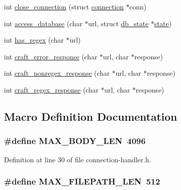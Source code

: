 \begin{DoxyCompactItemize}
int \hyperlink{connection-handler_8h_a0171242e91a6a1c18938b8aba84625e5}{close\-\_\-connection} (struct \hyperlink{structconnection}{connection} $\ast$conn)
\item 
int \hyperlink{connection-handler_8h_a371095605bf8a8222590bc46b2d38b59}{access\-\_\-database} (char $\ast$url, struct \hyperlink{structdb__state}{db\-\_\-state} $\ast$\hyperlink{http__parser_8c_adc6e5733fc3c22f0a7b2914188c49c90}{state})
\item 
int \hyperlink{connection-handler_8h_aad4e23d034482bdd8a28174ff70d3ea0}{has\-\_\-regex} (char $\ast$url)
\item 
int \hyperlink{connection-handler_8h_a8df53347c2a2137c4f39c79fbe3af03e}{craft\-\_\-error\-\_\-response} (char $\ast$url, char $\ast$response)
\item 
int \hyperlink{connection-handler_8h_a40ddee505082e691c9e94a8afda7d4b5}{craft\-\_\-nonregex\-\_\-response} (char $\ast$url, char $\ast$response)
\item 
int \hyperlink{connection-handler_8h_a7cb78a1a29fdde2658e016d01287bf7a}{craft\-\_\-regex\-\_\-response} (char $\ast$url, char $\ast$response)
\end{DoxyCompactItemize}


\subsection{Macro Definition Documentation}
\hypertarget{connection-handler_8h_ab5d508eee849407d84f67ece294ac8b0}{
\subsubsection[{M\-A\-X\-\_\-\-B\-O\-D\-Y\-\_\-\-L\-E\-N}]{\setlength{\rightskip}{0pt plus 5cm}\#define M\-A\-X\-\_\-\-B\-O\-D\-Y\-\_\-\-L\-E\-N~4096}}\label{connection-handler_8h_ab5d508eee849407d84f67ece294ac8b0}


Definition at line 30 of file connection-\/handler.\-h.

\hypertarget{connection-handler_8h_a55d3700b57daefe139c225b101a6d89f}{
\subsubsection[{M\-A\-X\-\_\-\-F\-I\-L\-E\-P\-A\-T\-H\-\_\-\-L\-E\-N}]{\setlength{\rightskip}{0pt plus 5cm}\#define M\-A\-X\-\_\-\-F\-I\-L\-E\-P\-A\-T\-H\-\_\-\-L\-E\-N~512}}\label{connection-handler_8h_a55d3700b57daefe139c225b101a6d89f}


